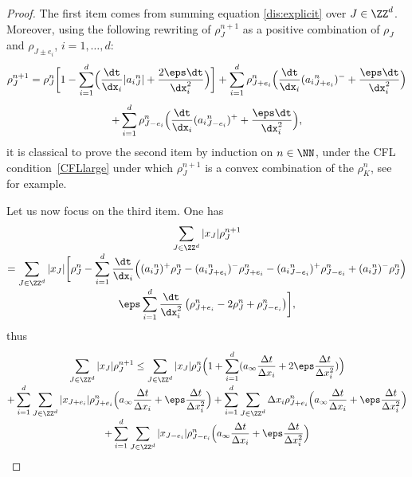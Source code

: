 \begin{proof}
The first item comes from summing equation \eqref{dis:explicit} over $J \in \ZZ^d$. Moreover, using the following rewriting of $\rho_{J}^{n+1}$ as a positive combination of $\rho_J$ and $\rho_{J\pm e_i}$, $i=1,\ldots,d$:\vspace*{-3pt}
\begin{multline*}
\rho_{J}^{n+1} = \rho_{J}^n \biggl[ 1 - \sum_{i=1}^d \Bigl(\frac{\dt}{\dx_i} |{a_i}^n_{J}| + \frac{2\eps\dt}{\dx_i^2}\Bigr) \biggr]
+ \sum_{i=1}^d \rho_{J+e_i}^n \Bigl(\frac{\dt}{\dx_i}({a_i}^n_{J+e_i})^- + \frac{\eps\dt}{\dx_i^2}\Bigr)\notag\\[-5pt] \\[-8pt]
+ \sum_{i=1}^d \rho_{J-e_i}^n \Bigl(\frac{\dt}{\dx_i}({a_i}^n_{J-e_i})^+ + \frac{\eps\dt}{\dx_i^2}\Bigr), \notag
\end{multline*}
it is classical to prove the second item by induction on $n \in \NN$, under the CFL condition~\eqref{CFLlarge} under which $\rho_J^{n+1}$ is a convex combination of the $\rho_K^n$, see \cite{leveque} for example.
\item Let us now focus on the third item. One has\vspace*{-5pt}
\begin{multline*}
\sum_{J\in \ZZ^d} |x_J|\rho_{J}^{n+1} \\[-3pt]
=
\sum_{J\in \ZZ^d} |x_J|\biggl[ \rho_{J}^n- \sum_{i=1}^{d} \frac{\dt}{\dx_i}
\Big(({a_i}^n_{J})^+ \rho_{J}^n - ({a_i}^n_{J+e_i})^- \rho_{J+e_i}^n
-({a_i}^n_{J-e_i})^+ \rho_{J-e_i}^n + ({a_i}^n_{J})^- \rho_{J}^n \Big) \\[-3pt]
\eps \sum_{i=1}^{d} \frac{\dt}{\dx_i^2} \left(\rho_{J+e_i}^n - 2\rho_J^n + \rho_{J-e_i}^n \right)\biggr],
\end{multline*}
thus\vspace*{-5pt}
\begin{multline*}
\sum_{J\in \ZZ^d} |x_J|\rho_{J}^{n+1} \leq \sum_{J\in \ZZ^d} |x_J|\rho_{J}^{n}
\Bigl( 1 + \sum_{i = 1}^d (a_\infty \frac{\Delta t}{\Delta x_i} + 2 \eps \frac{\Delta t}{\Delta x_i^2})\Bigr) \\[-3pt]
+ \sum_{i = 1}^d \sum_{J\in \ZZ^d} |x_{J+e_i}|\rho_{J + e_i}^{n} \Bigl(a_\infty \frac{\Delta t}{\Delta x_i} + \eps \frac{\Delta t}{\Delta x_i^2}\Bigr)
+ \sum_{i = 1}^d \sum_{J\in \ZZ^d} \Delta x_i\rho_{J + e_i}^{n} \Bigl(a_\infty \frac{\Delta t}{\Delta x_i} + \eps \frac{\Delta t}{\Delta x_i^2}\Bigr) \\[-3pt]
+ \sum_{i = 1}^d \sum_{J\in \ZZ^d} |x_{J-e_i}|\rho_{J - e_i}^{n} \Bigl(a_\infty \frac{\Delta t}{\Delta x_i} + \eps \frac{\Delta t}{\Delta x_i^2}\Bigr)

\end{multline*}
\end{proof}
